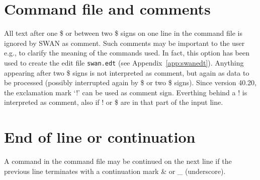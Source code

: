 \documentclass[12pt]{book}
\begin{document}
\section{Command file and comments}

All text after one \$ or between two \$ signs on one line in the command file is ignored by SWAN as
comment. Such comments may be important to the user e.g., to clarify the meaning of the commands
used. In fact, this option has been used to create the edit file {\tt swan.edt} (see
Appendix~\ref{app:swanedt}). Anything appearing after two \$ signs is not interpreted as comment, but
again as data to be processed (possibly interrupted again by \$ or two \$ signs). Since version 40.20,
the exclamation mark `!' can be used as comment sign. Everthing behind a ! is interpreted as comment,
also if ! or \$ are in that part of the input line.

\section{End of line or continuation} \label{sec:endlin}

A command in the command file may be continued on the next line if the previous line terminates with a
continuation mark \& or \_ (underscore).

 \label{app:swanedt}
\end{document}
